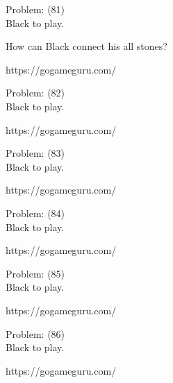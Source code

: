 \documentclass[11pt]{article}
\begin{document}
\begin{minipage}[t]{0.5\textwidth}
  {\centering
  
Problem: (81)\\
Black to play.

How can Black connect his all stones?

https://gogameguru.com/\\
  }
\end{minipage}
\begin{minipage}[t]{0.5\textwidth}
  {\centering
  
Problem: (82)\\
Black to play.

https://gogameguru.com/\\
  }
\end{minipage}
\begin{minipage}[t]{0.5\textwidth}
  {\centering
  
Problem: (83)\\
Black to play.

https://gogameguru.com/\\
  }
\end{minipage}
\begin{minipage}[t]{0.5\textwidth}
  {\centering
  
Problem: (84)\\
Black to play.

https://gogameguru.com/\\
  }
\end{minipage}
\begin{minipage}[t]{0.5\textwidth}
  {\centering
  
Problem: (85)\\
Black to play.

https://gogameguru.com/\\
  }
\end{minipage}
\begin{minipage}[t]{0.5\textwidth}
  {\centering
  
Problem: (86)\\
Black to play.

https://gogameguru.com/\\
  }
\end{minipage}
\end{document}
